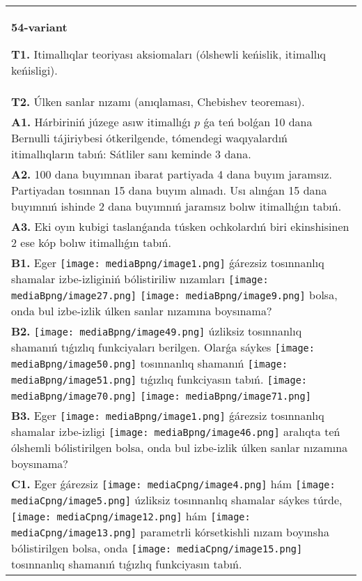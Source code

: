 \documentclass{article}
\begin{document}
\begin{tabular}{m{17cm}}
\textbf{54-variant}
\newline

\textbf{T1.} Itimallıqlar teoriyası aksiomaları (ólshewli keńislik, itimallıq keńisligi).
 \\
\textbf{T2.} 
Úlken sanlar nızamı (anıqlaması, Chebishev teoreması).
 \\
\textbf{A1.} Hárbiriniń júzege asıw itimallıǵı $p$ ǵa teń bolǵan 10 dana Bernulli tájiriybesi ótkerilgende, tómendegi waqıyalardıń itimallıqların tabıń: Sátliler sanı keminde 3 dana.
 \\
\textbf{A2.} 100 dana buyımnan ibarat partiyada 4 dana buyım jaramsız. Partiyadan tosınnan 15 dana buyım alınadı. Usı alınǵan 15 dana buyımnıń ishinde 2 dana buyımnıń jaramsız bolıw itimallıǵın tabıń.
 \\
\textbf{A3.} Eki oyın kubigi taslanǵanda túsken ochkolardıń biri ekinshisinen 2 ese kóp bolıw itimallıǵın tabıń.
 \\
\textbf{B1.} Eger \texttt{[image: mediaBpng/image1.png]} ǵárezsiz tosınnanlıq shamalar izbe-izliginiń bólistiriliw nızamları
\texttt{[image: mediaBpng/image27.png]} \texttt{[image: mediaBpng/image9.png]}
bolsa, onda bul izbe-izlik úlken sanlar nızamına boysınama?
 \\
\textbf{B2.} \texttt{[image: mediaBpng/image49.png]} úzliksiz tosınnanlıq shamanıń tıǵızlıq funkciyaları berilgen. Olarǵa sáykes \texttt{[image: mediaBpng/image50.png]} tosınnanlıq shamanıń \texttt{[image: mediaBpng/image51.png]} tıǵızlıq funkciyasın tabıń. \texttt{[image: mediaBpng/image70.png]} \texttt{[image: mediaBpng/image71.png]}
 \\
\textbf{B3.} Eger \texttt{[image: mediaBpng/image1.png]} ǵárezsiz tosınnanlıq shamalar izbe-izligi \texttt{[image: mediaBpng/image46.png]} aralıqta teń ólshemli bólistirilgen bolsa, onda bul izbe-izlik úlken sanlar nızamına boysınama?
 \\
\textbf{C1.} Eger ǵárezsiz \texttt{[image: mediaCpng/image4.png]} hám \texttt{[image: mediaCpng/image5.png]} úzliksiz tosınnanlıq shamalar sáykes túrde, \texttt{[image: mediaCpng/image12.png]} hám \texttt{[image: mediaCpng/image13.png]} parametrli kórsetkishli nızam boyınsha bólistirilgen bolsa, onda \texttt{[image: mediaCpng/image15.png]} tosınnanlıq shamanıń tıǵızlıq funkciyasın tabıń.

\end{tabular}
\end{document}
